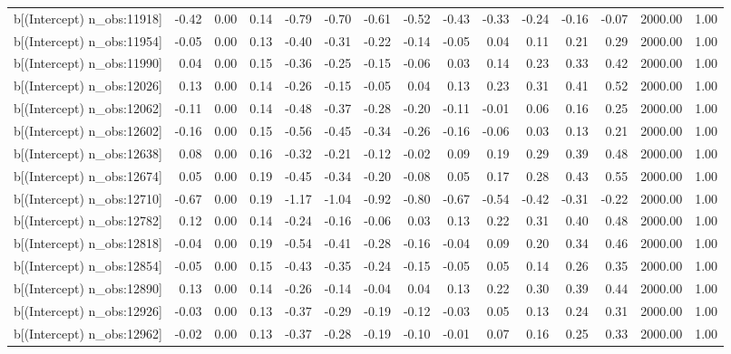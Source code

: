 \begin{table}[ht]
\begin{tabular}{rrrrrrrrrrrrrrr}
  b[(Intercept) n\_obs:11918] & -0.42 & 0.00 & 0.14 & -0.79 & -0.70 & -0.61 & -0.52 & -0.43 & -0.33 & -0.24 & -0.16 & -0.07 & 2000.00 & 1.00 \\ 
  b[(Intercept) n\_obs:11954] & -0.05 & 0.00 & 0.13 & -0.40 & -0.31 & -0.22 & -0.14 & -0.05 & 0.04 & 0.11 & 0.21 & 0.29 & 2000.00 & 1.00 \\ 
  b[(Intercept) n\_obs:11990] & 0.04 & 0.00 & 0.15 & -0.36 & -0.25 & -0.15 & -0.06 & 0.03 & 0.14 & 0.23 & 0.33 & 0.42 & 2000.00 & 1.00 \\ 
  b[(Intercept) n\_obs:12026] & 0.13 & 0.00 & 0.14 & -0.26 & -0.15 & -0.05 & 0.04 & 0.13 & 0.23 & 0.31 & 0.41 & 0.52 & 2000.00 & 1.00 \\ 
  b[(Intercept) n\_obs:12062] & -0.11 & 0.00 & 0.14 & -0.48 & -0.37 & -0.28 & -0.20 & -0.11 & -0.01 & 0.06 & 0.16 & 0.25 & 2000.00 & 1.00 \\ 
  b[(Intercept) n\_obs:12602] & -0.16 & 0.00 & 0.15 & -0.56 & -0.45 & -0.34 & -0.26 & -0.16 & -0.06 & 0.03 & 0.13 & 0.21 & 2000.00 & 1.00 \\ 
  b[(Intercept) n\_obs:12638] & 0.08 & 0.00 & 0.16 & -0.32 & -0.21 & -0.12 & -0.02 & 0.09 & 0.19 & 0.29 & 0.39 & 0.48 & 2000.00 & 1.00 \\ 
  b[(Intercept) n\_obs:12674] & 0.05 & 0.00 & 0.19 & -0.45 & -0.34 & -0.20 & -0.08 & 0.05 & 0.17 & 0.28 & 0.43 & 0.55 & 2000.00 & 1.00 \\ 
  b[(Intercept) n\_obs:12710] & -0.67 & 0.00 & 0.19 & -1.17 & -1.04 & -0.92 & -0.80 & -0.67 & -0.54 & -0.42 & -0.31 & -0.22 & 2000.00 & 1.00 \\ 
  b[(Intercept) n\_obs:12782] & 0.12 & 0.00 & 0.14 & -0.24 & -0.16 & -0.06 & 0.03 & 0.13 & 0.22 & 0.31 & 0.40 & 0.48 & 2000.00 & 1.00 \\ 
  b[(Intercept) n\_obs:12818] & -0.04 & 0.00 & 0.19 & -0.54 & -0.41 & -0.28 & -0.16 & -0.04 & 0.09 & 0.20 & 0.34 & 0.46 & 2000.00 & 1.00 \\ 
  b[(Intercept) n\_obs:12854] & -0.05 & 0.00 & 0.15 & -0.43 & -0.35 & -0.24 & -0.15 & -0.05 & 0.05 & 0.14 & 0.26 & 0.35 & 2000.00 & 1.00 \\ 
  b[(Intercept) n\_obs:12890] & 0.13 & 0.00 & 0.14 & -0.26 & -0.14 & -0.04 & 0.04 & 0.13 & 0.22 & 0.30 & 0.39 & 0.44 & 2000.00 & 1.00 \\ 
  b[(Intercept) n\_obs:12926] & -0.03 & 0.00 & 0.13 & -0.37 & -0.29 & -0.19 & -0.12 & -0.03 & 0.05 & 0.13 & 0.24 & 0.31 & 2000.00 & 1.00 \\ 
  b[(Intercept) n\_obs:12962] & -0.02 & 0.00 & 0.13 & -0.37 & -0.28 & -0.19 & -0.10 & -0.01 & 0.07 & 0.16 & 0.25 & 0.33 & 2000.00 & 1.00 \\ 

\end{tabular}
\end{table}
